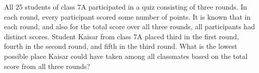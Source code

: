 All $25$ students of class $7\text{A}$ participated in a quiz consisting of three rounds. In each round, every participant scored some number of points. It is known that in each round, and also for the total score over all three rounds, all participants had distinct scores. Student Kaisar from class $7\text{A}$ placed third in the first round, fourth in the second round, and fifth in the third round. What is the lowest possible place Kaisar could have taken among all classmates based on the total score from all three rounds?

